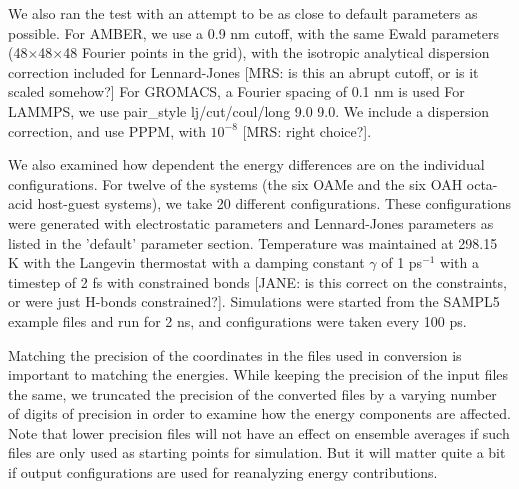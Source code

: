 We also ran the test with an attempt to be as close to default
parameters as possible. For AMBER, we use a 0.9 nm cutoff, with the
same Ewald parameters (48$\times$48$\times$48 Fourier points in the
grid), with the isotropic analytical dispersion correction included
for Lennard-Jones [MRS: is this an abrupt cutoff, or is it scaled
  somehow?] For GROMACS, a Fourier spacing of 0.1 nm is used For
LAMMPS, we use pair\_style lj/cut/coul/long 9.0 9.0.  We include a
dispersion correction, and use PPPM, with $10^{-8}$ [MRS: right choice?].

We also examined how dependent the energy differences are on the
individual configurations. For twelve of the systems (the six OAMe and
the six OAH octa-acid host-guest systems), we take 20 different
configurations. These configurations were generated with electrostatic
parameters and Lennard-Jones parameters as listed in the 'default'
parameter section. Temperature was maintained at 298.15 K with the
Langevin thermostat with a damping constant $\gamma$ of 1 ps$^{-1}$
with a timestep of 2 fs with constrained bonds [JANE: is this correct
  on the constraints, or were just H-bonds constrained?]. Simulations
were started from the SAMPL5 example files and run for 2 ns, and
configurations were taken every 100 ps.

Matching the precision of the coordinates in the files used in
conversion is important to matching the energies. 
While keeping the
precision of the input files the same, we truncated the precision of
the converted files by a varying number of digits of precision in order
to examine how the energy components are affected.
 Note that lower
precision files will not have an effect on ensemble averages if such
files are only used as starting points for simulation. But it will
matter quite a bit if output configurations are used for reanalyzing
energy contributions.

